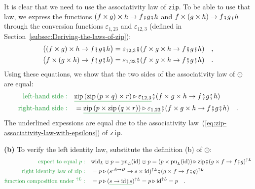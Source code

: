 It is clear that we need to use the associativity law of \lstinline!zip!.
To be able to use that law, we express the functions $(f\times g)\times h\rightarrow f\bef g\bef h$
and $f\times(g\times h)\rightarrow f\bef g\bef h$ through the conversion
functions $\varepsilon_{1,23}$ and $\varepsilon_{12,3}$ (defined
in Section~\ref{subsec:Deriving-the-laws-of-zip}):
\begin{align*}
 & \big((f\times g)\times h\rightarrow f\bef g\bef h\big)=\varepsilon_{12,3}\bef(f\times g\times h\rightarrow f\bef g\bef h)\quad,\\
 & \big(f\times(g\times h)\rightarrow f\bef g\bef h\big)=\varepsilon_{1,23}\bef(f\times g\times h\rightarrow f\bef g\bef h)\quad.
\end{align*}
Using these equations, we show that the two sides of the associativity
law of $\odot$ are equal:
\begin{align*}
{\color{greenunder}\text{left-hand side}:}\quad & \gunderline{\text{zip}\left(\text{zip}\left(p\times q\right)\times r\right)\triangleright\varepsilon_{12,3}}\bef(f\times g\times h\rightarrow f\bef g\bef h)\\
{\color{greenunder}\text{right-hand side}:}\quad & =\gunderline{\text{zip}\left(p\times\text{zip}\left(q\times r\right)\right)\triangleright\varepsilon_{1,23}}\bef(f\times g\times h\rightarrow f\bef g\bef h)\quad.
\end{align*}
The underlined expessions are equal due to the associativity law~(\ref{eq:zip-associativity-law-with-epsilons})
of \lstinline!zip!.

\textbf{(b)} To verify the left identity law, substitute the definition
(b) of $\odot$:
\begin{align*}
{\color{greenunder}\text{expect to equal }p:}\quad & \text{wid}_{L}\odot p=\text{pu}_{L}(\text{id})\odot p=(p\times\text{pu}_{L}(\text{id}))\triangleright\text{zip}\bef(g\times f\rightarrow f\bef g)^{\uparrow L}\\
{\color{greenunder}\text{right identity law of }\text{zip}:}\quad & =p\triangleright(s^{:A\rightarrow B}\rightarrow s\times\text{id})^{\uparrow L}\bef(g\times f\rightarrow f\bef g)^{\uparrow L}\\
{\color{greenunder}\text{function composition under }^{\uparrow L}:}\quad & =p\triangleright(\gunderline{s\rightarrow\text{id}\bef s})^{\uparrow L}=p\triangleright\text{id}^{\uparrow L}=p\quad.
\end{align*}

